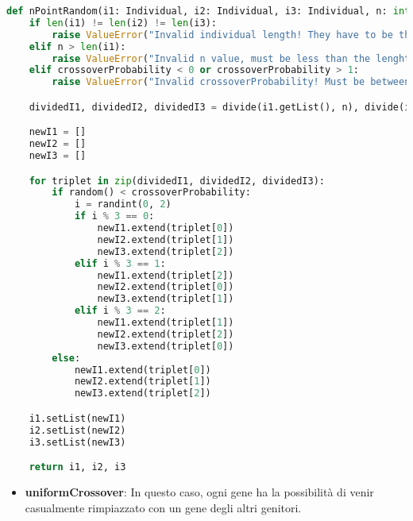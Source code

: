 \documentclass{article}
\begin{document}
\begin{lstlisting}[language=Python, breaklines, no caption]
def nPointRandom(i1: Individual, i2: Individual, i3: Individual, n: int, crossoverProbability: float) -> tuple[Individual, Individual, Individual]:
    if len(i1) != len(i2) != len(i3):
        raise ValueError("Invalid individual length! They have to be the same.")
    elif n > len(i1):
        raise ValueError("Invalid n value, must be less than the lenght of the individual!")
    elif crossoverProbability < 0 or crossoverProbability > 1:
        raise ValueError("Invalid crossoverProbability! Must be between 0 and 1.")

    dividedI1, dividedI2, dividedI3 = divide(i1.getList(), n), divide(i2.getList(), n), divide(i3.getList(), n)

    newI1 = []
    newI2 = []
    newI3 = []

    for triplet in zip(dividedI1, dividedI2, dividedI3):
        if random() < crossoverProbability:
            i = randint(0, 2)
            if i % 3 == 0:
                newI1.extend(triplet[0])
                newI2.extend(triplet[1])
                newI3.extend(triplet[2])
            elif i % 3 == 1:
                newI1.extend(triplet[2])
                newI2.extend(triplet[0])
                newI3.extend(triplet[1])
            elif i % 3 == 2:
                newI1.extend(triplet[1])
                newI2.extend(triplet[2])
                newI3.extend(triplet[0])
        else:
            newI1.extend(triplet[0])
            newI2.extend(triplet[1])
            newI3.extend(triplet[2])

    i1.setList(newI1)
    i2.setList(newI2)
    i3.setList(newI3)

    return i1, i2, i3
        \end{lstlisting}

\pagebreak


\begin{itemize}
\item\textbf{uniformCrossover}: In questo caso, ogni gene ha la possibilità di venir casualmente rimpiazzato con un gene degli altri genitori.
\end{itemize}
\end{document}
